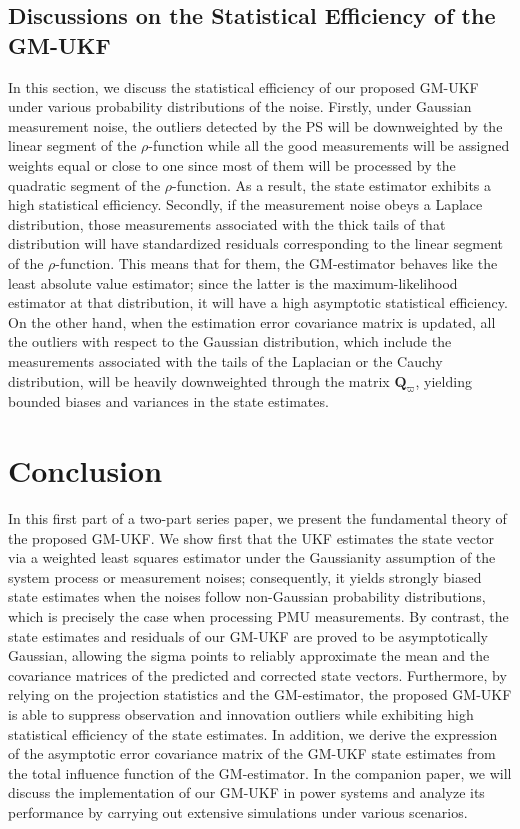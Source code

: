 \documentclass[10pt]{IEEEtran}
\begin{document}
\subsection{Discussions on the Statistical Efficiency of the GM-UKF}
In this section, we discuss the statistical efficiency of our proposed GM-UKF under various probability distributions of the noise. Firstly, under Gaussian measurement noise, the outliers detected by the PS will be downweighted by the linear segment of the $\rho$-function while all the good measurements will be assigned weights equal or close to one since most of them will be processed by the quadratic segment of the $\rho$-function. As a result, the state estimator exhibits a high statistical efficiency. Secondly, if the measurement noise obeys a Laplace distribution, those measurements associated with the thick tails of that distribution will have standardized residuals corresponding to the linear segment of the $\rho$-function. This means that for them, the GM-estimator behaves like the least absolute value estimator; since the latter is the maximum-likelihood estimator at that distribution, it will have a high asymptotic statistical efficiency. On the other hand, when the estimation error covariance matrix is updated, all the outliers with respect to the Gaussian distribution, which include the measurements associated with the tails of the Laplacian or the Cauchy distribution, will be heavily downweighted through the matrix ${\bm{Q}_\varpi}$, yielding bounded biases and variances in the state estimates.

\section{Conclusion}
In this first part of a two-part series paper, we present the fundamental theory of the proposed GM-UKF. We show first that the UKF estimates the state vector via a weighted least squares estimator under the Gaussianity assumption of the system process or measurement noises; consequently, it yields strongly biased state estimates when the noises follow non-Gaussian probability distributions, which is precisely the case when processing PMU measurements. By contrast, the state estimates and residuals of our GM-UKF are proved to be asymptotically Gaussian, allowing the sigma points to reliably approximate the mean and the covariance matrices of the predicted and corrected state vectors. Furthermore, by relying on the projection statistics and the GM-estimator, the proposed GM-UKF is able to suppress observation and innovation outliers while exhibiting high statistical efficiency of the state estimates. In addition, we derive the expression of the asymptotic error covariance matrix of the GM-UKF state estimates from the total influence function of the GM-estimator. In the companion paper, we will discuss the implementation of our GM-UKF in power systems and analyze its performance by carrying out extensive simulations under various scenarios.
\end{document}
